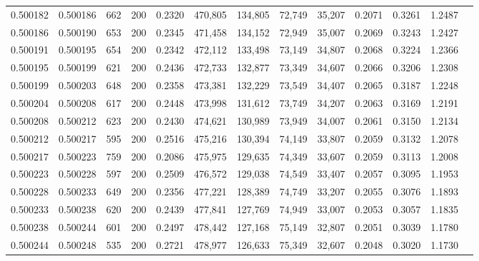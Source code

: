\begin{tabular}{rrrrrrrrrrrrr}
0.500182 & 0.500186 &   662 & 200 &                                     0.2320 & 470,805 & 134,805 &  72,749 &  35,207 & 0.2071 & 0.3261 & 1.2487 \\
0.500186 & 0.500190 &   653 & 200 &                                     0.2345 & 471,458 & 134,152 &  72,949 &  35,007 & 0.2069 & 0.3243 & 1.2427 \\
0.500191 & 0.500195 &   654 & 200 &                                     0.2342 & 472,112 & 133,498 &  73,149 &  34,807 & 0.2068 & 0.3224 & 1.2366 \\
0.500195 & 0.500199 &   621 & 200 &                                     0.2436 & 472,733 & 132,877 &  73,349 &  34,607 & 0.2066 & 0.3206 & 1.2308 \\
0.500199 & 0.500203 &   648 & 200 &                                     0.2358 & 473,381 & 132,229 &  73,549 &  34,407 & 0.2065 & 0.3187 & 1.2248 \\
0.500204 & 0.500208 &   617 & 200 &                                     0.2448 & 473,998 & 131,612 &  73,749 &  34,207 & 0.2063 & 0.3169 & 1.2191 \\
0.500208 & 0.500212 &   623 & 200 &                                     0.2430 & 474,621 & 130,989 &  73,949 &  34,007 & 0.2061 & 0.3150 & 1.2134 \\
0.500212 & 0.500217 &   595 & 200 &                                     0.2516 & 475,216 & 130,394 &  74,149 &  33,807 & 0.2059 & 0.3132 & 1.2078 \\
0.500217 & 0.500223 &   759 & 200 &                                     0.2086 & 475,975 & 129,635 &  74,349 &  33,607 & 0.2059 & 0.3113 & 1.2008 \\
0.500223 & 0.500228 &   597 & 200 &                                     0.2509 & 476,572 & 129,038 &  74,549 &  33,407 & 0.2057 & 0.3095 & 1.1953 \\
0.500228 & 0.500233 &   649 & 200 &                                     0.2356 & 477,221 & 128,389 &  74,749 &  33,207 & 0.2055 & 0.3076 & 1.1893 \\
0.500233 & 0.500238 &   620 & 200 &                                     0.2439 & 477,841 & 127,769 &  74,949 &  33,007 & 0.2053 & 0.3057 & 1.1835 \\
0.500238 & 0.500244 &   601 & 200 &                                     0.2497 & 478,442 & 127,168 &  75,149 &  32,807 & 0.2051 & 0.3039 & 1.1780 \\
0.500244 & 0.500248 &   535 & 200 &                                     0.2721 & 478,977 & 126,633 &  75,349 &  32,607 & 0.2048 & 0.3020 & 1.1730 \\

\end{tabular}
